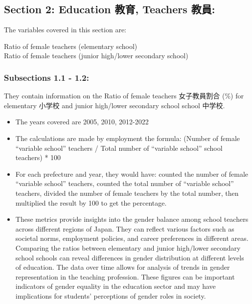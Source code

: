 \documentclass[
]{ltjarticle}
\begin{document}
\hypertarget{section-2-education-ux6559ux80b2-teachers-ux6559ux54e1}{%
\subsection{Section 2: Education 教育, Teachers
教員:}\label{section-2-education-ux6559ux80b2-teachers-ux6559ux54e1}}

The variables covered in this section are:

Ratio of female teachers (elementary school)\\
Ratio of female teachers (junior high/lower secondary school)

\hypertarget{subsections-1.1---1.2}{%
\subsubsection{Subsections 1.1 - 1.2:}\label{subsections-1.1---1.2}}

They contain information on the Ratio of female teachers 女子教員割合
(\%) for elementary 小学校 and junior high/lower secondary school school
中学校.

\begin{itemize}
\item
  The years covered are 2005, 2010, 2012-2022
\item
  The calculations are made by employment the formula: (Number of female
  ``variable school'' teachers / Total number of ``variable school''
  school teachers) * 100
\item
  For each prefecture and year, they would have: counted the number of
  female ``variable school'' teachers, counted the total number of
  ``variable school'' teachers, divided the number of female teachers by
  the total number, then multiplied the result by 100 to get the
  percentage.
\item
  These metrics provide insights into the gender balance among school
  teachers across different regions of Japan. They can reflect various
  factors such as societal norms, employment policies, and career
  preferences in different areas. Comparing the ratios between
  elementary and junior high/lower secondary school schools can reveal
  differences in gender distribution at different levels of education.
  The data over time allows for analysis of trends in gender
  representation in the teaching profession. These figures can be
  important indicators of gender equality in the education sector and
  may have implications for students' perceptions of gender roles in
  society.
\end{itemize}
\end{document}
